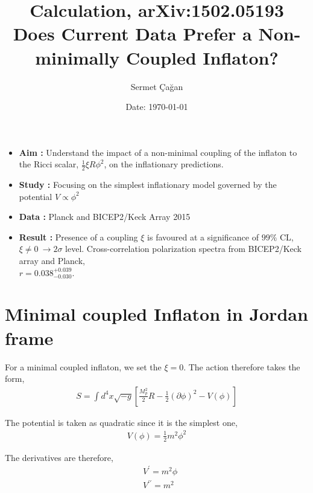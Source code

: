 

\title{\textbf{Calculation, arXiv:1502.05193\\Does Current Data Prefer a Non-minimally Coupled Inflaton?}}
\author{Sermet \c{C}a\u{g}an}
\date{Date: \today}



\maketitle
\vspace{2cm}
\begin{itemize}
\item \textbf{Aim :} Understand the impact of a non-minimal coupling of the inflaton to the Ricci scalar, $\frac{1}{2}\xi R\phi^{2}$, on the inflationary predictions.
\item \textbf{Study :} Focusing on the simplest inflationary model governed by the potential $V \propto \phi^{2}$
\item \textbf{Data :} Planck and BICEP2/Keck Array 2015
\item \textbf{Result :} Presence of a coupling $\xi$ is favoured at a significance of $99\%$ CL, $\xi \ne 0 \ \rightarrow 2\sigma$ level. Cross-correlation polarization spectra from BICEP2/Keck array and Planck,\\ $r = 0.038 ^{+0.039} _{-0.030}$.
\end{itemize}
\newpage

\section{Minimal coupled Inflaton in Jordan frame}

For a minimal coupled inflaton, we set the $\xi = 0$. The action therefore takes the form,
\begin{align}
S = \int d^{4}x \sqrt{-g}\left[\frac{M_{p}^{2}}{2}R - \frac{1}{2}\left(\partial\phi\right)^{2} - V\left(\phi\right)\right]
\end{align}

The potential is taken as quadratic since it is the simplest one,
\begin{align}
V\left(\phi\right) = \frac{1}{2}m^{2}\phi^{2}
\end{align}

The derivatives are therefore,
\begin{align}
&V^{\prime} = m^{2}\phi\\
&V^{\prime\prime} = m^{2}
\end{align}


